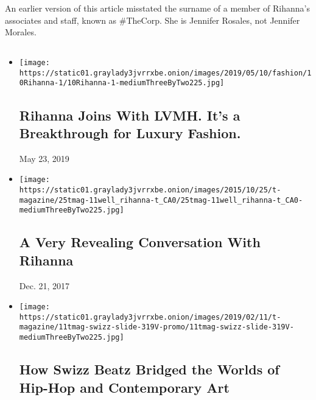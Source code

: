 An earlier version of this article misstated the surname of a member of
Rihanna's associates and staff, known as \#TheCorp. She is Jennifer
Rosales, not Jennifer Morales.

\subsection{}

\begin{itemize}
\item
  \href{https://www.nytimes3xbfgragh.onion/2019/05/10/fashion/rihanna-lvmh-fenty.html}{}

  \texttt{[image: https://static01.graylady3jvrrxbe.onion/images/2019/05/10/fashion/10Rihanna-1/10Rihanna-1-mediumThreeByTwo225.jpg]}

  \hypertarget{rihanna-joins-with-lvmh-its-a-breakthrough-for-luxury-fashion}{%
  \subsection{Rihanna Joins With LVMH. It's a Breakthrough for Luxury
  Fashion.}\label{rihanna-joins-with-lvmh-its-a-breakthrough-for-luxury-fashion}}

  May 23, 2019
\item
  \href{https://www.nytimes3xbfgragh.onion/2015/10/12/t-magazine/rihanna-miranda-july-interview.html}{}

  \texttt{[image: https://static01.graylady3jvrrxbe.onion/images/2015/10/25/t-magazine/25tmag-11well\_rihanna-t\_CA0/25tmag-11well\_rihanna-t\_CA0-mediumThreeByTwo225.jpg]}

  \hypertarget{a-very-revealing-conversation-with-rihanna}{%
  \subsection{A Very Revealing Conversation With
  Rihanna}\label{a-very-revealing-conversation-with-rihanna}}

  Dec. 21, 2017
\item
  \href{https://www.nytimes3xbfgragh.onion/2019/02/13/t-magazine/swizz-beatz-art.html}{}

  \texttt{[image: https://static01.graylady3jvrrxbe.onion/images/2019/02/11/t-magazine/11tmag-swizz-slide-319V-promo/11tmag-swizz-slide-319V-mediumThreeByTwo225.jpg]}

  \hypertarget{how-swizz-beatz-bridged-the-worlds-of-hip-hop-and-contemporary-art}{%
  \subsection{How Swizz Beatz Bridged the Worlds of Hip-Hop and
  Contemporary
  Art}\label{how-swizz-beatz-bridged-the-worlds-of-hip-hop-and-contemporary-art}}


\end{itemize}
